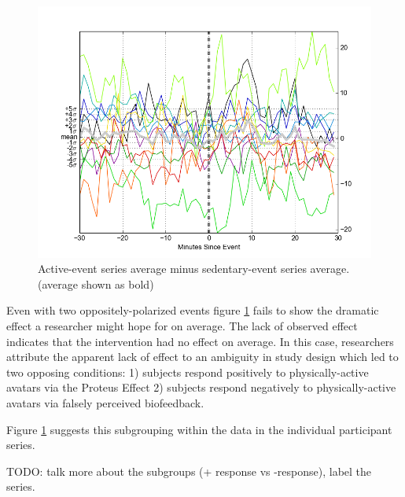 \begin{figure}
\centering
\includegraphics[width=0.9\columnwidth]{./img/mAvatar_difference_events.png}
\caption{Active-event series average minus sedentary-event series average. (average shown as bold)}
\label{fig:mAvatarDifference}
\end{figure}

Even with two oppositely-polarized events figure \ref{fig:mAvatarDifference} fails to show the dramatic effect a researcher might hope for on average.
The lack of observed effect indicates that the intervention had no effect on average.
In this case, researchers attribute the apparent lack of effect to an ambiguity in study design which led to two opposing conditions: 1) subjects respond positively to physically-active avatars via the Proteus Effect \cite{???} 2) subjects respond negatively to physically-active avatars via falsely perceived biofeedback.

Figure \ref{fig:mAvatarDifference} suggests this subgrouping within the data in the individual participant series.

TODO: talk more about the subgroups (+ response vs -response), label the series.

